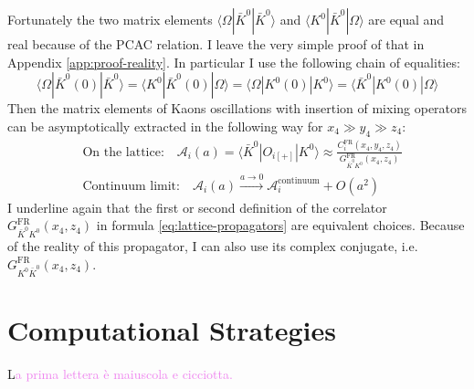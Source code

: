 \documentclass[english, LaM, oneside, noexaminfo]{sapthesis}
\newcommand{\la}{\langle}
\newcommand{\ra}{\rangle}
\newcommand{\colv}{\textcolor{violet}}
\begin{document}
Fortunately the two matrix elements $\la \Omega | \bar K^0 | \bar K^0 \ra$ and $\la K^0 | \bar K^0 | \Omega \ra$ are equal and real because of the PCAC relation.
I leave the very simple proof of that in Appendix \ref{app:proof-reality}.
In particular I use the following chain of equalities:
$$\la \Omega | \bar K^0 (0) | \bar K^0 \ra = \la K^0 | \bar K^0 (0) | \Omega \ra = \la \Omega | K^0 (0) | K^0 \ra = \la \bar K^0 | K^0 (0) | \Omega \ra $$
Then the matrix elements of Kaons oscillations with insertion of mixing operators can be asymptotically extracted in the following way for $x_4 \gg y_4 \gg z_4$:
\begin{equation}\label{eq:matrix-elements-extraction}
    \begin{split}
        & \text{On the lattice:} \quad \mathcal{A}_i (a) = \la \bar K^0 | O_{i[+]} | K^0 \ra \approx \frac{C_i^\text{FR} (x_4,y_4,z_4)}{G_{\bar K^0 K^0}^\text{FR}(x_4,z_4)} \\
        & \text{Continuum limit:} \quad \mathcal{A}_i (a) \xrightarrow{a \rightarrow 0} \mathcal{A}_i^\text{continuum} + O(a^2)
    \end{split}
\end{equation}
I underline again that the first or second definition of the correlator $G_{\bar K^0 K^0}^\text{FR}(x_4,z_4)$ in formula \ref{eq:lattice-propagators} are equivalent choices.
Because of the reality of this propagator, I can also use its complex conjugate, i.e. $G_{K^0 \bar K^0}^\text{FR}(x_4,z_4)$.


\chapter{Computational Strategies}
\lettrine[lines=2, findent=3pt, nindent=0pt]{L}{}\colv{a prima lettera è maiuscola e cicciotta.}
\end{document}
